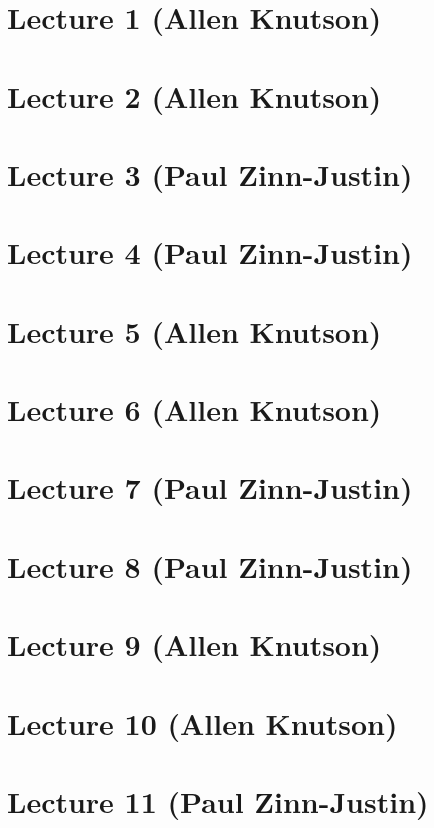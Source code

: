 \documentclass[12pt]{amsart}
\numberwithin{equation}{section}
\theoremstyle{definition}
\numberwithin{figure}{section}
\begin{document}
\section{Lecture 1 (Allen Knutson)}

\section{Lecture 2 (Allen Knutson)}

\section{Lecture 3 (Paul Zinn-Justin)}

\section{Lecture 4 (Paul Zinn-Justin)}

\section{Lecture 5 (Allen Knutson)}

\section{Lecture 6 (Allen Knutson)}

\section{Lecture 7 (Paul Zinn-Justin)}

\section{Lecture 8 (Paul Zinn-Justin)}

\section{Lecture 9 (Allen Knutson)}

\section{Lecture 10 (Allen Knutson)}

\section{Lecture 11 (Paul Zinn-Justin)}
\end{document}

